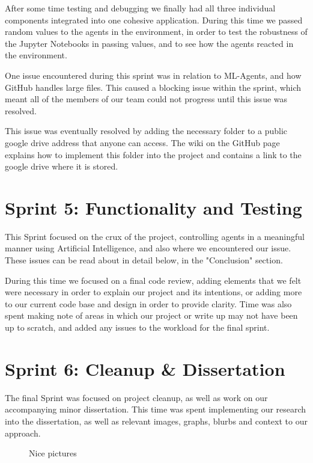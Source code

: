 	After some time testing and debugging we finally had all three individual components integrated into one cohesive application. During this time we passed random values to the agents in the environment, in order to test the robustness of the Jupyter Notebooks in passing values, and to see how the agents reacted in the environment.
	
	One issue encountered during this sprint was in relation to ML-Agents, and how GitHub handles large files. This caused a blocking issue within the sprint, which meant all of the members of our team could not progress until this issue was resolved. 
	
	This issue was eventually resolved by adding the necessary folder to a public google drive address that anyone can access. The wiki on the GitHub page explains how to implement this folder into the project and contains a link to the google drive where it is stored.


\section{Sprint 5: Functionality and Testing}
	
	This Sprint focused on the crux of the project, controlling agents in a meaningful manner using Artificial Intelligence, and also where we encountered our issue. These issues can be read about in detail below, in the "Conclusion" section. 
	
	During this time we focused on a final code review, adding elements that we felt were necessary in order to explain our project and its intentions, or adding more to our current code base and design in order to provide clarity.
	Time was also spent making note of areas in which our project or write up may not have been up to scratch, and added any issues to the workload for the final sprint.


\section{Sprint 6: Cleanup \& Dissertation} 

	The final Sprint was focused on project cleanup, as well as work on our accompanying minor dissertation. This time was spent implementing our research into the dissertation, as well as relevant images, graphs, blurbs and context to our approach.  


\begin{figure}
  \centering
  \caption{Nice pictures}
  \label{tikz:graphs}
\end{figure}